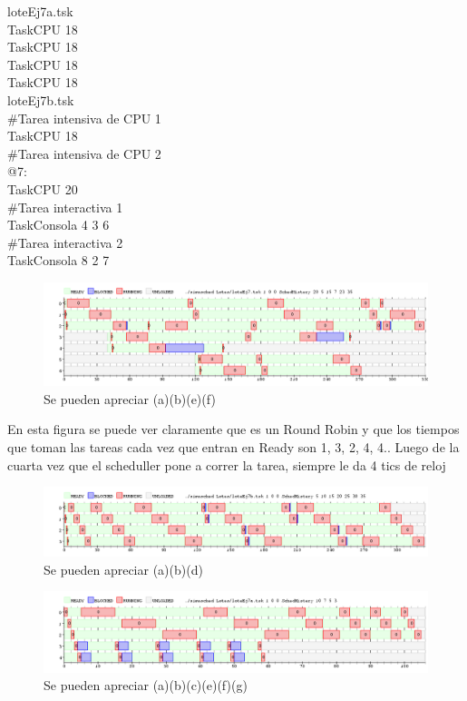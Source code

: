 loteEj7a.tsk\\
TaskCPU 18\\
TaskCPU 18\\
TaskCPU 18\\
TaskCPU 18\\


loteEj7b.tsk\\
\#Tarea intensiva de CPU 1\\
TaskCPU 18\\
\#Tarea intensiva de CPU 2\\
@7:\\
TaskCPU 20\\
\#Tarea interactiva 1\\
TaskConsola 4 3 6\\
\#Tarea interactiva 2\\
TaskConsola 8 2 7 \\





\begin{figure}[H]
  \centering
    \includegraphics[width=1.1\textwidth]{imagenes/test1ej7.png}
  \caption{Se pueden apreciar (a)(b)(e)(f)}
  \label{fig:ej7a}
\end{figure}

En esta figura se puede ver claramente que es un Round Robin y que los tiempos que toman las tareas cada vez que entran en Ready son 1, 3, 2, 4, 4.. Luego de la cuarta vez que el scheduller pone a correr la tarea, siempre le da 4 tics de reloj


\begin{figure}[H]
  \centering
    \includegraphics[width=1.1\textwidth]{imagenes/test2ej7.png}
  \caption{Se pueden apreciar (a)(b)(d)}
  \label{fig:test2ej7}
\end{figure}


\begin{figure}[H]
  \centering
    \includegraphics[width=1.1\textwidth]{imagenes/test3ej7.png}
  \caption{Se pueden apreciar (a)(b)(c)(e)(f)(g)}
  \label{fig:test3ej7}
\end{figure}

